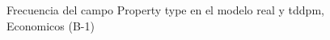 \begin{figure}[H]
    \centering
    
    \caption{Frecuencia del campo Property type en el modelo real y tddpm, Economicos (B-1)}
    \label{frecuency-Property Type-tddpm_mlp}
\end{figure}